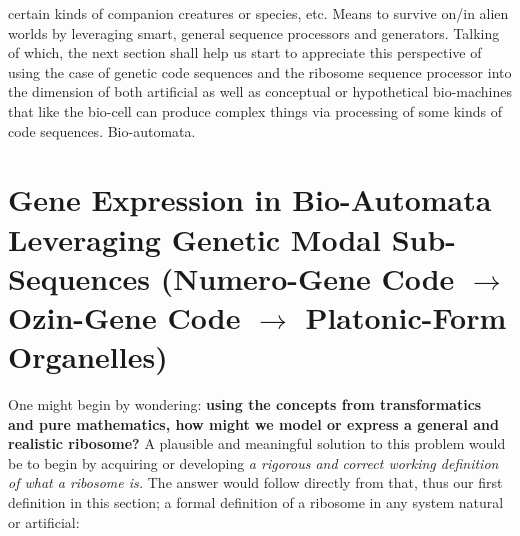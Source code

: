 \documentclass[a4paper, 18pt]{article} %
\begin{document}
certain kinds of companion creatures or species, etc. Means to survive on/in alien worlds by leveraging smart, general sequence processors and generators. Talking of which, the next section shall help us start to appreciate this perspective of using the case of genetic code sequences and the ribosome sequence processor into the dimension of both artificial as well as conceptual or hypothetical bio-machines that like the bio-cell can produce complex things via processing of some kinds of code sequences. Bio-automata.


\section{Gene Expression in Bio-Automata Leveraging Genetic Modal Sub-Sequences (Numero-Gene Code $\rightarrow$ Ozin-Gene Code $\rightarrow$ Platonic-Form Organelles)}
\label{SEC5}

One might begin by wondering: \textbf{using the concepts from transformatics and pure mathematics, how might we model or express a general and realistic ribosome?} A plausible and meaningful solution to this problem would be to begin by acquiring or developing \textit{a rigorous and correct working definition of what a ribosome is.} The answer would follow directly from that, thus our first definition in this section; a formal definition of a ribosome in any system natural or artificial:


\end{document}
